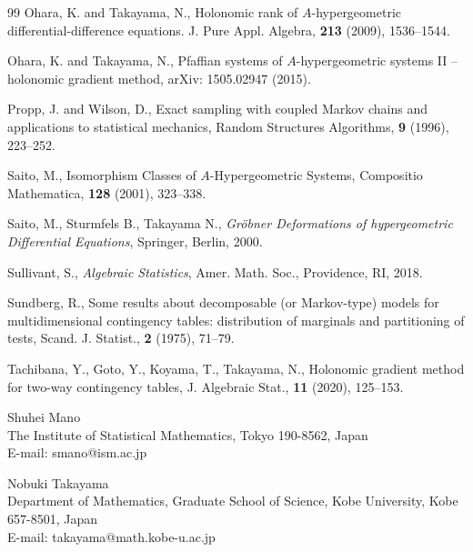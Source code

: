 \documentclass[a4paper,12pt]{article}
\theoremstyle{plain}
\theoremstyle{remark}
\begin{document}
\begin{thebibliography}{99}
Ohara, K. and Takayama, N.,
Holonomic rank of $A$-hypergeometric differential-difference
equations.
J. Pure Appl. Algebra,
\textbf{213} (2009), 1536--1544.

Ohara, K. and Takayama, N.,
Pfaffian systems of $A$-hypergeometric systems II -- holonomic
gradient method,
arXiv: 1505.02947 (2015).

Propp, J. and Wilson, D.,
Exact sampling with coupled Markov chains and applications to
statistical mechanics,
Random Structures Algorithms,
\textbf{9} (1996), 223--252.


Saito, M.,
Isomorphism Classes of $A$-Hypergeometric Systems,
Compositio Mathematica,
\textbf{128} (2001), 323--338.

Saito, M., Sturmfels B., Takayama N.,
\textit{Gr\"obner Deformations of hypergeometric Differential
  Equations},
Springer, Berlin, 2000.
  
Sullivant, S.,
\textit{Algebraic Statistics},
Amer. Math. Soc., Providence, RI, 2018.

Sundberg, R.,
Some results about decomposable (or Markov-type) models
for multidimensional contingency tables: distribution of
marginals and partitioning of tests,
Scand. J. Statist.,
\textbf{2} (1975), 71--79.

Tachibana, Y., Goto, Y., Koyama, T., Takayama, N.,
Holonomic gradient method for two-way contingency tables,
J. Algebraic Stat.,
\textbf{11} (2020), 125--153.
  


\end{thebibliography}

\begin{flushleft}

Shuhei Mano\\
The Institute of Statistical Mathematics, Tokyo 190-8562, Japan\\
E-mail: smano@ism.ac.jp

\smallskip

Nobuki Takayama\\
Department of Mathematics, Graduate School of Science,
Kobe University, Kobe 657-8501, Japan\\
E-mail: takayama@math.kobe-u.ac.jp

\end{flushleft}
\end{document}
